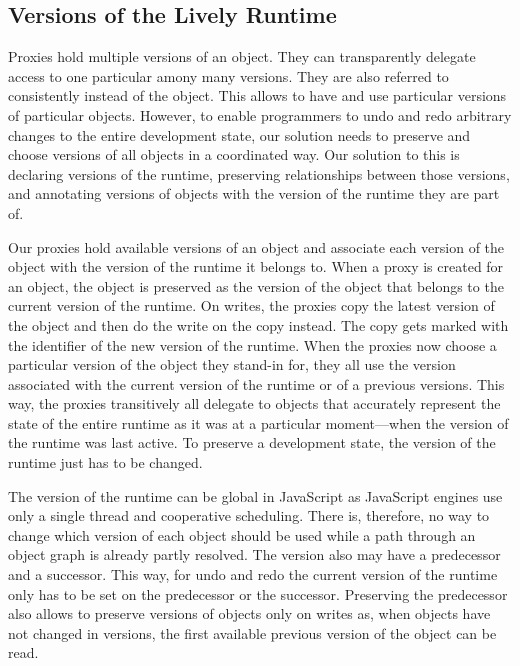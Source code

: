 \subsection{Versions of the Lively Runtime} %

Proxies hold multiple versions of an object.
They can transparently delegate access to one particular amony many versions.
They are also referred to consistently instead of the object.
This allows to have and use particular versions of particular objects.
However, to enable programmers to undo and redo arbitrary changes to the entire development state, our solution needs to preserve and choose versions of all objects in a coordinated way.
Our solution to this is declaring versions of the runtime, preserving relationships between those versions, and annotating versions of objects with the version of the runtime they are part of.

Our proxies hold available versions of an object and associate each version of the object with the version of the runtime it belongs to.
When a proxy is created for an object, the object is preserved as the version of the object that belongs to the current version of the runtime.
On writes, the proxies copy the latest version of the object and then do the write on the copy instead.
The copy gets marked with the identifier of the new version of the runtime.
When the proxies now choose a particular version of the object they stand-in for, they all use the version associated with the current version of the runtime or of a previous versions.
This way, the proxies transitively all delegate to objects that accurately represent the state of the entire runtime as it was at a particular moment---when the version of the runtime was last active.
To preserve a development state, the version of the runtime just has to be changed.

The version of the runtime can be global in JavaScript as JavaScript engines use only a single thread and cooperative scheduling.
There is, therefore, no way to change which version of each object should be used while a path through an object graph is already partly resolved.
The version also may have a predecessor and a successor.
This way, for undo and redo the current version of the runtime only has to be set on the predecessor or the successor.
Preserving the predecessor also allows to preserve versions of objects only on writes as, when objects have not changed in versions, the first available previous version of the object can be read.


